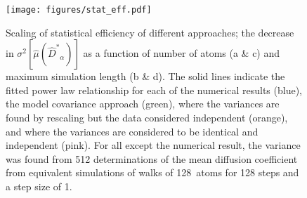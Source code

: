 \documentclass[reprint,superscriptaddress,nobibnotes,amsmath,amssymb,aps,prx,hidelinks]{revtex4-2}
\newcommand{\Dest}{\ensuremath{\widehat{D}^*}}
\begin{document}
\begin{figure}
    \centering
    \texttt{[image: figures/stat\_eff.pdf]}
    \caption{
        Scaling of statistical efficiency of different approaches;
        the decrease in $\sigma^2[\hat{\mu}(\Dest_\alpha)]$ as a function of number of atoms (a \& c) and maximum simulation length (b \& d).
        The solid lines indicate the fitted power law relationship for each of the numerical results (blue), the model covariance approach (green), where the variances are found by rescaling but the data considered independent (orange), and where the variances are considered to be identical and independent (pink). 
        For all except the numerical result, the variance was found from \num{512} determinations of the mean diffusion coefficient from equivalent simulations of walks of \SI{128}{atoms} for \num{128} steps and a step size of \num{1}.
        }
    \label{fig:stat_eff}
\end{figure}
% 
\end{document}
